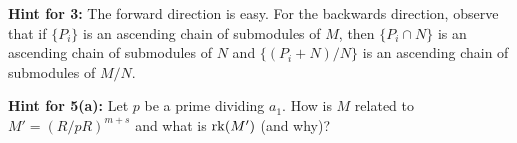 \documentclass[12pt]{amsart}
\begin{document}
\newpage

{\bf Hint for 3:} The forward direction is easy. For the backwards direction,
observe that if $\{P_i\}$ is an ascending chain of submodules of $M$,
then $\{P_i\cap N\}$ is an ascending chain of submodules of $N$
and $\{(P_i+N)/N\}$ is an ascending chain of submodules of $M/N$.

\newpage


{\bf Hint for 5(a):} Let $p$ be a prime
dividing $a_1$. How is $M$ related to $M'=(R/pR)^{m+s}$
and what is ${\rm rk}(M')$ (and why)?
\end{document}
